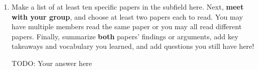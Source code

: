 \documentclass[letterpaper,11pt]{article}
\begin{document}
\begin{enumerate}
\item 
Make a list of at least ten specific papers in the subfield here. Next, \textbf{meet with your group}, and choose at least two papers each to read. You may have multiple members read the same paper or you may all read different papers. Finally, summarize \textbf{both} papers' findings or arguments, add key takeaways and vocabulary you learned, and add questions you still have here!
\begin{tcolorbox}
TODO: Your answer here
\newline
\newline
\newline
\newline
\newline
\newline
\newline
\newline
\newline
\newline
\newline
\newline
\newline
\newline
\newline
\newline
\newline
\newline
\newline
\newline
\newline
\newline
\newline
\newline
\newline
\newline
\newline
\newline
\newline
\newline
\newline
\newline
\newline
\newline
\newline
\newline
\newline
\end{tcolorbox}

\end{enumerate}
\end{document}
